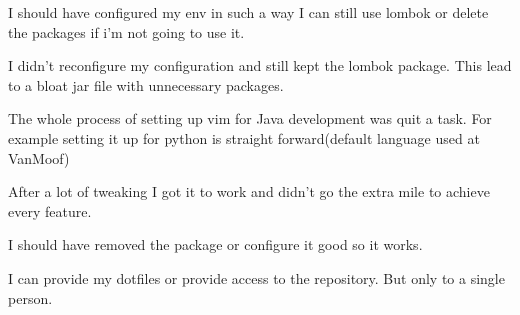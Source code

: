 {{{			I should have configured my env in such a way I can still use lombok or delete the packages if i'm not going to use it.

		}
		{%
			I didn't reconfigure my configuration and still kept the lombok package.
			This lead to a bloat jar file with unnecessary packages.
		}
		{%
			The whole process of setting up vim for Java development was quit a task.
			For example setting it up for python is straight forward(default language used at VanMoof)

			After a lot of tweaking I got it to work and didn't go the extra mile to achieve every feature.

			I should have removed the package or configure it good so it works.
		}
		{
			I can provide my dotfiles or provide access to the repository.
			But only to a single person.

}}}

